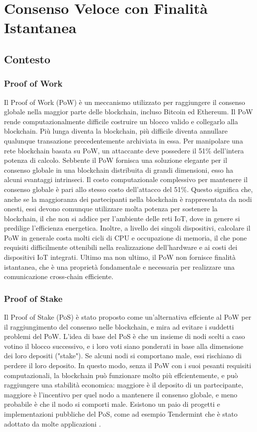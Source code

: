 \section{Consenso Veloce con Finalità Istantanea}

\subsection{Contesto}

\subsubsection{Proof of Work}
Il Proof of Work (PoW) è un meccanismo utilizzato per raggiungere il consenso globale nella maggior parte delle blockchain, incluso Bitcoin ed Ethereum. Il PoW rende computazionalmente difficile costruire un blocco valido e collegarlo alla blockchain. Più lunga diventa la blockchain, più difficile diventa annullare qualunque transazione precedentemente archiviata in essa. Per manipolare una rete blockchain basata su PoW, un attaccante deve possedere il 51\% dell'intera potenza di calcolo.
Sebbente il PoW fornisca una soluzione elegante per il consenso globale in una blockchain distribuita di grandi dimensioni, esso ha alcuni svantaggi intrinseci. Il costo computazionale complessivo per mantenere il consenso globale è pari allo stesso costo dell'attacco del 51\%. Questo significa che, anche se la maggioranza dei partecipanti nella blockchain è rappresentata da nodi onesti, essi devono comunque utilizzare molta potenza per sostenere la blockchain, il che non si addice per l'ambiente delle reti IoT, dove in genere si predilige l'efficienza energetica. Inoltre, a livello dei singoli dispositivi, calcolare il PoW in generale costa molti cicli di CPU e occupazione di memoria, il che pone requisiti difficilmente ottenibili nella realizzazione dell'hardware e ai costi dei dispositivi IoT integrati. Ultimo ma non ultimo, il PoW non fornisce finalità istantanea, che è una proprietà fondamentale e necessaria per realizzare una comunicazione cross-chain efficiente.

\subsubsection{Proof of Stake}
Il Proof of Stake (PoS) è stato proposto come un'alternativa effciente al PoW per il raggiungimento del consenso nelle blockchain, e mira ad evitare i suddetti problemi del PoW. L'idea di base del PoS è che un insieme di nodi scelti a caso votino il blocco successivo, e i loro voti siano ponderati in base alla dimensione dei loro depositi ("stake"). Se alcuni nodi si comportano male, essi rischiano di perdere il loro deposito. In questo modo, senza il PoW con i suoi pesanti requisiti computazionali, la blockchain può funzionare molto più effcientemente, e può raggiungere una stabilità economica: maggiore è il deposito di un partecipante, maggiore è l'incentivo per quel nodo a mantenere il consenso globale, e meno probabile è che il nodo si comporti male. Esistono un paio di progetti e implementazioni pubbliche del PoS, come ad esempio Tendermint \cite{c32} che è stato adottato da molte applicazioni \cite{c33}.

